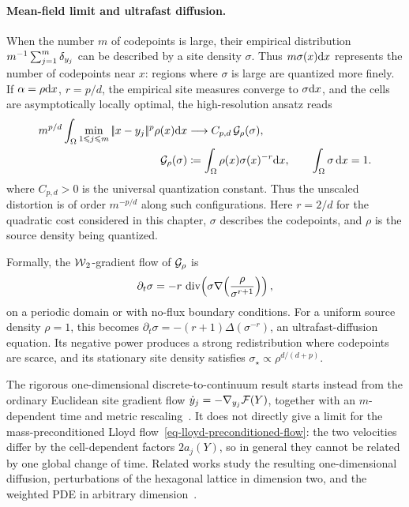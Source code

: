 \paragraph{Mean-field limit and ultrafast diffusion.}
When the number \(m\) of codepoints is large, their empirical distribution
\(
m^{-1}\sum_{j=1}^m\delta_{y_j}
\)
can be described by a site density \(\sigma\). Thus \(m\sigma(x)\mathrm{d} x\) represents the number of codepoints near \(x\): regions where \(\sigma\) is large are quantized more finely. If \(\alpha=\rho\mathrm{d} x\), \(r=p/d\), the empirical site measures converge to \(\sigma\mathrm{d} x\), and the cells are asymptotically locally optimal, the high-resolution ansatz reads~\cite{graf2000foundationsquantization}
\[
	\begin{aligned}
		m^{p/d}\int_\Omega \min_{1\leqslant j\leqslant m}|\!| x-y_j |\!|^{p}\rho(x)\mathrm{d} x
		&\longrightarrow C_{p,d}\,\mathcal{G}_\rho(\sigma),\\
		\mathcal{G}_\rho(\sigma)
		&\coloneqq \int_\Omega \rho(x) \sigma(x)^{-r}\mathrm{d} x,
		\qquad \int_\Omega \sigma\,\mathrm{d} x=1.
	\end{aligned}
\]
where \(C_{p,d}>0\) is the universal quantization constant. Thus the unscaled distortion is of order \(m^{-p/d}\) along such configurations. Here \(r=2/d\) for the quadratic cost considered in this chapter, \(\sigma\) describes the codepoints, and \(\rho\) is the source density being quantized.

Formally, the \(\operatorname{\mathcal{W}}_2\)-gradient flow of \(\mathcal{G}_\rho\) is
\[
	\partial_t \sigma
	=
	-r\,\operatorname{div}\!\left(
	\sigma\nabla\!\left(\frac{\rho}{\sigma^{r+1}}\right)
	\right),
\]
on a periodic domain or with no-flux boundary conditions. For a uniform source density \(\rho=1\), this becomes \(\partial_t\sigma=-(r+1)\Delta(\sigma^{-r})\), an ultrafast-diffusion equation. Its negative power produces a strong redistribution where codepoints are scarce, and its stationary site density satisfies \(\sigma_\star\propto\rho^{d/(d+p)}\).

The rigorous one-dimensional discrete-to-continuum result starts instead from the ordinary Euclidean site gradient flow \(\dot y_j=-\nabla_{y_j}\mathcal{F}(Y)\), together with an \(m\)-dependent time and metric rescaling~\cite{caglioti2015gradient}. It does not directly give a limit for the mass-preconditioned Lloyd flow~\eqref{eq-lloyd-preconditioned-flow}: the two velocities differ by the cell-dependent factors \(2a_j(Y)\), so in general they cannot be related by one global change of time. Related works study the resulting one-dimensional diffusion, perturbations of the hexagonal lattice in dimension two, and the weighted PDE in arbitrary dimension~\cite{iacobelli2019asymptotic,caglioti2018quantization2d,iacobelli2019weighted}.

